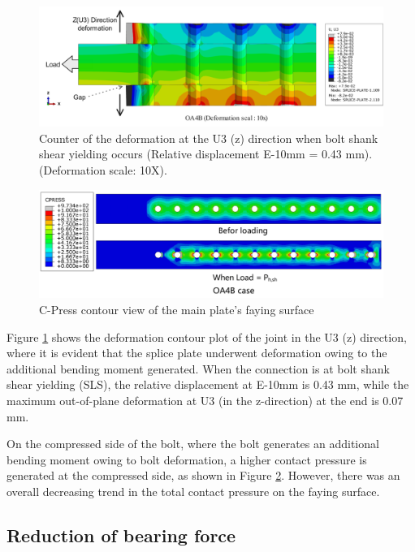 \begin{figure}
    \centering
    \includegraphics[width=0.8\linewidth]{imgs/ch7/OP-def-ana.pdf}
    \caption{Counter of the deformation at the U3 (z) direction when bolt shank shear yielding occurs (Relative displacement E-10mm = 0.43 mm). (Deformation scale: 10X).}
    \label{fig-OP-def-ana}
\end{figure}

\begin{figure}
    \centering
    \includegraphics[width=0.8\linewidth]{imgs/ch7/OA4B-cpress.pdf}
    \caption{C-Press contour view of the main plate's faying surface}
    \label{fig-cpress}
\end{figure}

Figure \ref{fig-OP-def-ana} shows the deformation contour plot of the joint in the U3 (z) direction, where it is evident that the splice plate underwent deformation owing to the additional bending moment generated. When the connection is at bolt shank shear yielding (SLS), the relative displacement at E-10mm is 0.43 mm, while the maximum out-of-plane deformation at U3 (in the z-direction) at the end is 0.07 mm.

On the compressed side of the bolt, where the bolt generates an additional bending moment owing to bolt deformation, a higher contact pressure is generated at the compressed side, as shown in Figure \ref{fig-cpress}. However, there was an overall decreasing trend in the total contact pressure on the faying surface.



\subsection{Reduction of bearing force} \label{sec-rduc-bea}

